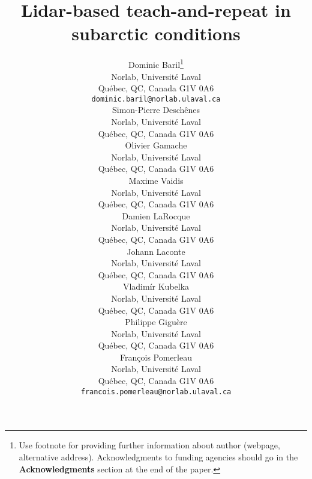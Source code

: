 \documentclass{article}
\title{Lidar-based teach-and-repeat in subarctic conditions}
\author{
Dominic Baril\thanks{ Use footnote for providing further information
	about author (webpage, alternative address). Acknowledgments to
	funding agencies should go in the \textbf{Acknowledgments} section
	at the end of the paper.} \\
Norlab, Universit\'{e} Laval\\
Qu\'{e}bec, QC, Canada G1V 0A6 \\
\texttt{dominic.baril@norlab.ulaval.ca} \\
\And
Simon-Pierre Desch\^{e}nes \\
Norlab, Universit\'{e} Laval\\
Qu\'{e}bec, QC, Canada G1V 0A6 \\
\And
Olivier Gamache \\
Norlab, Universit\'{e} Laval\\
Qu\'{e}bec, QC, Canada G1V 0A6 \\
\And
Maxime Vaidis \\
Norlab, Universit\'{e} Laval\\
Qu\'{e}bec, QC, Canada G1V 0A6 \\
\And
Damien LaRocque \\
Norlab, Universit\'{e} Laval\\
Qu\'{e}bec, QC, Canada G1V 0A6 \\
\And
Johann Laconte \\
Norlab, Universit\'{e} Laval\\
Qu\'{e}bec, QC, Canada G1V 0A6 \\
\And
Vladim\'{i}r Kubelka \\
Norlab, Universit\'{e} Laval\\
Qu\'{e}bec, QC, Canada G1V 0A6 \\
\And
Philippe Gigu\`{e}re \\
Norlab, Universit\'{e} Laval\\
Qu\'{e}bec, QC, Canada G1V 0A6 \\
\And
Fran\c{c}ois Pomerleau \\
Norlab, Universit\'{e} Laval\\
Qu\'{e}bec, QC, Canada G1V 0A6 \\
\texttt{francois.pomerleau@norlab.ulaval.ca} \\
}
\begin{document}
\maketitle

\begin{abstract}
	\lightlipsum[1]
\end{abstract}











%
%
\printbibliography
\end{document}
